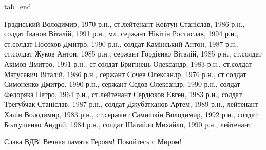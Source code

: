 tab_end
\fi

\begin{multicols}{2}
\obeycr
Градиський Володимир, 1970 р.н., ст.лейтенант
Ковтун Станіслав, 1986 р.н., солдат
Іванов Віталій, 1991 р.н., мл. сержант
Нікітін Ростислав, 1994 р.н., ст.солдат
Посохов Дмитро, 1990 р.н., солдат
Камінський Антон, 1987 р.н., ст.солдат
Жуков Антон, 1985 р.н., сержант
Гордієнко Віталій, 1985 р.н., ст.солдат
Акімов Дмитро, 1991 р.н., ст.солдат
Бригінець Олександр, 1983 р.н., ст.солдат
Матусевич Віталій, 1986 р.н., сержант
Сочев Олександр, 1976 р.н., ст.солдат
Симоненко Дмитро, 1990 р.н., сержант
Сєдов Олександр, 1990 р.н., солдат
Федоряка Петро, 1964 р.н., ст.лейтенант
Сердюков Євген, 1983 р.н., солдат
Трегубчак Станіслав, 1987 р.н., солдат
Джубатканов Артем, 1989 р.н., лейтенант
Халін Володимир, 1983 р.н., ст.сержант
Самишкін Володимир, 1992 р.н., солдат
Болтушенко Андрій, 1984 р.н., солдат
Шатайло Михайло, 1990 р.н., лейтенант
\restorecr
\end{multicols}

Слава ВДВ! Вечная память Героям! Покойтесь с Миром!

